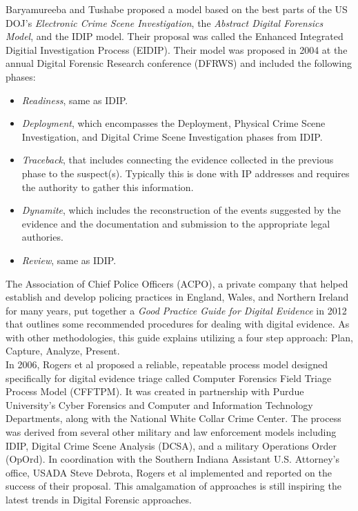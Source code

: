 \documentclass[12pt]{article}
\begin{document}
Baryamureeba and Tushabe\cite{baryamureeba2004enhanced} proposed a model based
on the best parts of the US DOJ's {\em Electronic Crime
Scene Investigation}, the {\em Abstract Digital Forensics Model}, and 
the IDIP model.  Their proposal was called the
Enhanced Integrated Digitial Investigation Process (EIDIP).
Their model was proposed in 2004 at the annual Digital Forensic Research conference
(DFRWS)\cite{baryamureeba2004enhanced} and included the following phases:

\begin{itemize}
  \item {\em Readiness}, same as IDIP.
  \item {\em Deployment}, which encompasses the Deployment,
  Physical Crime Scene Investigation, and Digital Crime Scene
  Investigation phases from IDIP.
  \item {\em Traceback}, that includes connecting the evidence collected
  in the previous phase to the suspect(s).  Typically this is done with IP
  addresses and requires the authority to gather this information.
  \item {\em Dynamite}, which includes the reconstruction of the events
  suggested by the evidence and  the documentation and submission to the
  appropriate legal authories.
  \item {\em Review}, same as IDIP.
\end{itemize}

The Association of Chief Police Officers (ACPO), a private company that helped establish and
develop policing practices in England, Wales, and Northern Ireland for many years,
put together a {\em Good Practice Guide for Digital Evidence}\cite{williams2012acpo} in 2012 that outlines some
recommended procedures for dealing with digital evidence.  As with other methodologies, this guide
explains utilizing a four step approach: Plan, Capture, Analyze, Present.\\

In 2006, Rogers et al\cite{rogers2006computer} proposed a reliable, repeatable process 
model designed specifically for digital evidence triage called
Computer Forensics Field Triage Process Model (CFFTPM). It was created in partnership
with Purdue University's Cyber Forensics and Computer and Information
Technology Departments, along with the National White Collar Crime
Center\cite{rogers2006computer}.
The process was derived from several other military and law enforcement models
including IDIP, 
Digital Crime Scene Analysis (DCSA),
and a military Operations Order (OpOrd).  In coordination with the Southern Indiana 
Assistant U.S. Attorney's office,
USADA Steve Debrota, Rogers et al\cite{rogers2006computer} implemented and reported
on the success of their proposal.  This amalgamation of approaches is still inspiring 
the latest trends in Digital Forensic approaches.\\
\end{document}
